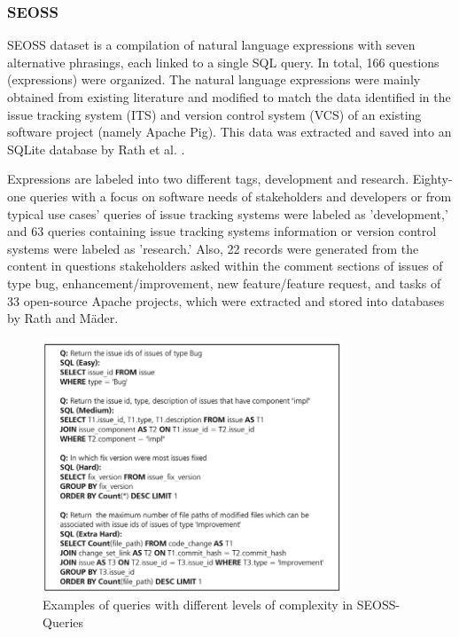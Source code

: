 \subsubsection{SEOSS}

SEOSS dataset is a compilation of natural language expressions with seven alternative phrasings, each linked to a single SQL query. In total, 166 questions (expressions) were organized. The natural language expressions were mainly obtained from existing literature and modified to match the data identified in the issue tracking system (ITS) and version control system (VCS) of an existing software project (namely Apache Pig). This data was extracted and saved into an SQLite database by Rath et al. \cite{RATH2019104005}.

Expressions are labeled into two different tags, development and research. Eighty-one queries with a focus on software needs of stakeholders and developers or from typical use cases' queries of issue tracking systems were labeled as 'development,' and 63 queries containing issue tracking systems information or version control systems were labeled as 'research.' Also, 22 records were generated from the content in questions stakeholders asked within the comment sections of issues of type bug, enhancement/improvement, new feature/feature request, and tasks of 33 open-source Apache projects, which were extracted and stored into databases by Rath and Mäder\cite{RATH2019104005}.


\begin{figure}[htb]
    \centering
    \includegraphics[width=0.8\textwidth]{pics/seoss/seoss.png}
    \caption{\small Examples of queries with different levels of complexity in SEOSS-Queries \cite{TOMOVA2022108211}}
    \label{fig:SESS2}
\end{figure}

